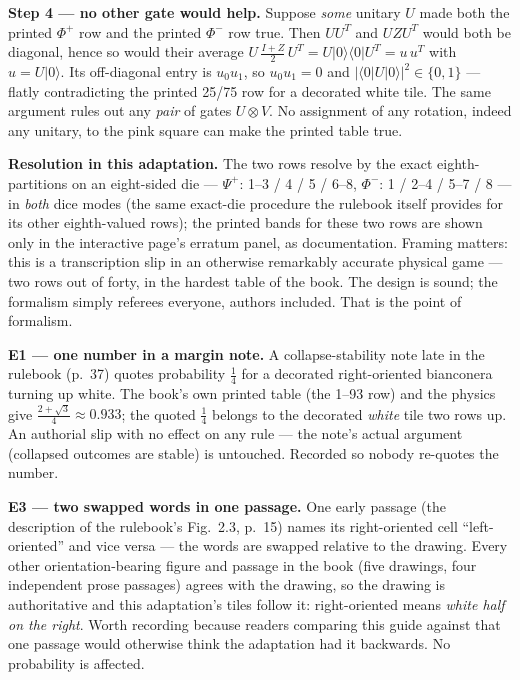 \documentclass[a4paper,11pt]{article}
\providecommand{\ket}[1]{|#1\rangle}
\providecommand{\bra}[1]{\langle#1|}
\providecommand{\ketbra}[2]{|#1\rangle\langle#2|}
\begin{document}
\begin{erratumbox}
\medskip
\noindent\textbf{Step 4 --- no other gate would help.} Suppose \emph{some} unitary
$U$ made both the printed $\Phi^+$ row and the printed $\Phi^-$ row true. Then
$U U^{T}$ and $U Z U^{T}$ would both be diagonal, hence so would their average
$U\,\tfrac{I + Z}{2}\,U^{T} = U\ketbra{0}{0}U^{T} = u\,u^{T}$ with $u = U\ket{0}$. Its
off-diagonal entry is $u_0 u_1$, so $u_0 u_1 = 0$ and $|\bra{0}U\ket{0}|^2 \in \{0, 1\}$
--- flatly contradicting the printed 25/75 row for a decorated white tile. The same
argument rules out any \emph{pair} of gates $U \otimes V$. No assignment of any rotation,
indeed any unitary, to the pink square can make the printed table true.

\medskip
\noindent\textbf{Resolution in this adaptation.} The two rows resolve by the exact
eighth-partitions on an eight-sided die --- $\Psi^+$: 1--3 / 4 / 5 / 6--8,
$\Phi^-$: 1 / 2--4 / 5--7 / 8 --- in \emph{both} dice modes (the same exact-die
procedure the rulebook itself provides for its other eighth-valued rows); the printed
bands for these two rows are shown only in the interactive page's erratum panel, as
documentation. Framing matters: this is a transcription slip in an otherwise remarkably
accurate physical game --- two rows out of forty, in the hardest table of the book. The
design is sound; the formalism simply referees everyone, authors included. That is the
point of formalism.
\end{erratumbox}

\begin{erratumbox}
\textbf{E1 --- one number in a margin note.} A collapse-stability note late in the
rulebook (p.~37) quotes probability $\tfrac14$ for a decorated right-oriented
bianconera turning up white. The book's own printed table (the 1--93 row) and the
physics give $\tfrac{2 + \sqrt 3}{4} \approx 0.933$; the quoted $\tfrac14$ belongs to the
decorated \emph{white} tile two rows up. An authorial slip with no effect on any rule
--- the note's actual argument (collapsed outcomes are stable) is untouched. Recorded so
nobody re-quotes the number.
\end{erratumbox}

\begin{erratumbox}
\textbf{E3 --- two swapped words in one passage.} One early passage (the
description of the rulebook's Fig.~2.3, p.~15) names its right-oriented cell ``left-oriented'' and vice versa ---
the words are swapped relative to the drawing. Every other orientation-bearing figure
and passage in the book (five drawings, four independent prose passages) agrees with the
drawing, so the drawing is authoritative and this adaptation's tiles follow it:
right-oriented means \emph{white half on the right}. Worth recording because readers
comparing this guide against that one passage would otherwise think the adaptation had
it backwards. No probability is affected.
\end{erratumbox}
\end{document}
